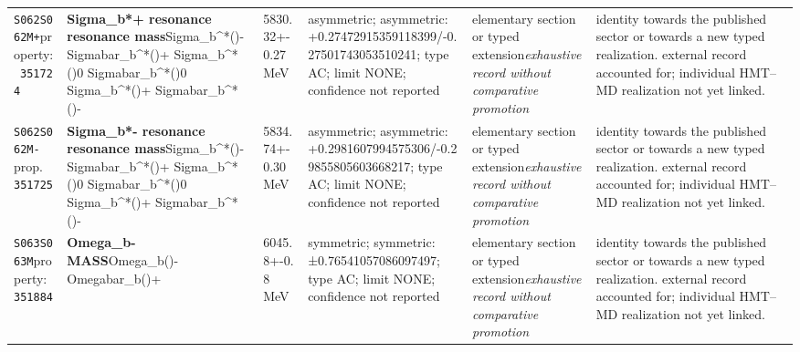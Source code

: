 \begin{landscape}
\begin{longtable}{L{1.85cm}L{4.45cm}L{2.35cm}L{4.05cm}L{3.35cm}L{7.15cm}}
\texttt{S062}\newline \texttt{S062M+}\newline property:\ \texttt{351724} & \textbf{Sigma\_\allowbreak{}b*+ resonance resonance mass}\newline Sigma\_\allowbreak{}b\textasciicircum{}*()- \textbar{}\allowbreak{} Sigmabar\_\allowbreak{}b\textasciicircum{}*()+ \textbar{}\allowbreak{} Sigma\_\allowbreak{}b\textasciicircum{}*()0 \textbar{}\allowbreak{} Sigmabar\_\allowbreak{}b\textasciicircum{}*()0 \textbar{}\allowbreak{} Sigma\_\allowbreak{}b\textasciicircum{}*()+ \textbar{}\allowbreak{} Sigmabar\_\allowbreak{}b\textasciicircum{}*()- & 5830.32+-0.27\,MeV & asymmetric; asymmetric: +0.27472915359118399/-0.27501743053510241; type AC; limit NONE; confidence not reported & elementary section or typed extension\newline \emph{exhaustive record without comparative promotion} & identity towards the published sector or towards a new typed realization. external record accounted for; individual HMT--MD realization not yet linked. \\
\texttt{S062}\newline \texttt{S062M-}\newline prop.\ \texttt{351725} & \textbf{Sigma\_\allowbreak{}b*- resonance resonance mass}\newline Sigma\_\allowbreak{}b\textasciicircum{}*()- \textbar{}\allowbreak{} Sigmabar\_\allowbreak{}b\textasciicircum{}*()+ \textbar{}\allowbreak{} Sigma\_\allowbreak{}b\textasciicircum{}*()0 \textbar{}\allowbreak{} Sigmabar\_\allowbreak{}b\textasciicircum{}*()0 \textbar{}\allowbreak{} Sigma\_\allowbreak{}b\textasciicircum{}*()+ \textbar{}\allowbreak{} Sigmabar\_\allowbreak{}b\textasciicircum{}*()- & 5834.74+-0.30\,MeV & asymmetric; asymmetric: +0.2981607994575306/-0.29855805603668217; type AC; limit NONE; confidence not reported & elementary section or typed extension\newline \emph{exhaustive record without comparative promotion} & identity towards the published sector or towards a new typed realization. external record accounted for; individual HMT--MD realization not yet linked. \\
\texttt{S063}\newline \texttt{S063M}\newline property:\ \texttt{351884} & \textbf{Omega\_\allowbreak{}b- MASS}\newline Omega\_\allowbreak{}b()- \textbar{}\allowbreak{} Omegabar\_\allowbreak{}b()+ & 6045.8+-0.8\,MeV & symmetric; symmetric: ±0.76541057086097497; type AC; limit NONE; confidence not reported & elementary section or typed extension\newline \emph{exhaustive record without comparative promotion} & identity towards the published sector or towards a new typed realization. external record accounted for; individual HMT--MD realization not yet linked. \\

\end{longtable}
\end{landscape}
